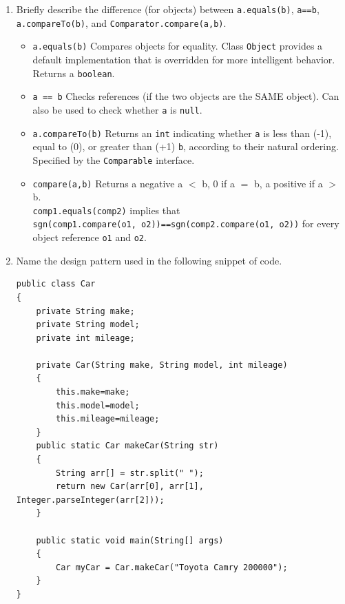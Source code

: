 \documentclass[11pt]{article}
\newenvironment{answer}{\large\lstset{basicstyle=\tiny\ttfamily}\color{white}}{}
\newenvironment{answer}{\large\lstset{basicstyle=\large\ttfamily}\color{red}}{}
\begin{document}
\begin{enumerate}
\item Briefly describe the difference (for objects) between \texttt{a.equals(b)}, \texttt{a==b},
      \texttt{a.compareTo(b)}, and \texttt{Comparator.compare(a,b)}.

    \begin{answer}
    \begin{itemize}

    \item \texttt{a.equals(b)} Compares objects for equality. Class \texttt{Object} provides a default implementation
	that is overridden for more intelligent behavior.
    Returns a \texttt{boolean}.

    \item \texttt{a == b}  Checks references (if the two objects are the SAME object).
    Can also be used to check whether \texttt{a} is \texttt{null}.

    \item \texttt{a.compareTo(b)} Returns an \texttt{int} indicating whether \texttt{a} is less than (-1),
    equal to (0), or greater than (+1) \texttt{b}, according to their natural ordering.
	Specified by the \texttt{Comparable} interface.

    \item \texttt{compare(a,b)} Returns a negative a $<$ b, 0 if a $=$ b, a positive if a $>$ b. \\
    \texttt{comp1.equals(comp2)} implies that \\ \texttt{sgn(comp1.compare(o1,
    o2))==sgn(comp2.compare(o1, o2))} for every object reference \texttt{o1} and \texttt{o2}.

    \end{itemize}
    \end{answer}

\item Name the design pattern used in the following snippet of code.
\begin{lstlisting}
public class Car
{
	private String make;
	private String model;
	private int mileage;

	private Car(String make, String model, int mileage)
	{
		this.make=make;
		this.model=model;
		this.mileage=mileage;
	}
	public static Car makeCar(String str)
	{
		String arr[] = str.split(" ");
		return new Car(arr[0], arr[1], Integer.parseInteger(arr[2]));
	}

	public static void main(String[] args)
	{
		Car myCar = Car.makeCar("Toyota Camry 200000");
	}
}
\end{lstlisting}


\end{enumerate}
\end{document}
